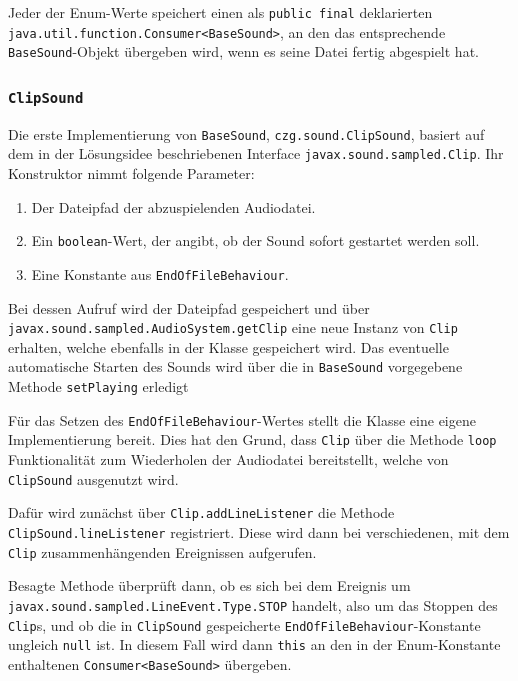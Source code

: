 \begin{sloppypar}
Jeder der Enum-Werte speichert einen als \texttt{public final}
deklarierten \texttt{java.util.function.Consumer<BaseSound>},
an den das entsprechende \texttt{BaseSound}-Objekt übergeben
wird, wenn es seine Datei fertig abgespielt hat.


\subsubsection{\texttt{ClipSound}}

Die erste Implementierung von \texttt{BaseSound}, \texttt{czg.sound.ClipSound},
basiert auf dem in der Lösungsidee beschriebenen Interface
\texttt{javax.sound.sampled.Clip}. Ihr Konstruktor nimmt folgende
Parameter:

\begin{enumerate}
	\item Der Dateipfad der abzuspielenden Audiodatei.
	\item Ein \texttt{boolean}-Wert, der angibt, ob der
	      Sound sofort gestartet werden soll.
	\item Eine Konstante aus \texttt{EndOfFileBehaviour}.
\end{enumerate}

Bei dessen Aufruf wird der Dateipfad gespeichert und über
\texttt{javax.sound.sampled.AudioSystem.getClip} eine
neue Instanz von \texttt{Clip} erhalten, welche ebenfalls
in der Klasse gespeichert wird. Das eventuelle automatische
Starten des Sounds wird über die in \texttt{BaseSound} vorgegebene Methode
\texttt{setPlaying} erledigt

Für das Setzen des \texttt{EndOfFileBehaviour}-Wertes
stellt die Klasse eine eigene Implementierung bereit.
Dies hat den Grund, dass \texttt{Clip} über die Methode
\texttt{loop} Funktionalität zum Wiederholen der Audiodatei
bereitstellt, welche von \texttt{ClipSound} ausgenutzt wird.

Dafür wird zunächst über \texttt{Clip.addLineListener}
die Methode \texttt{ClipSound.lineListener} registriert.
Diese wird dann bei verschiedenen, mit dem \texttt{Clip}
zusammenhängenden Ereignissen aufgerufen.

Besagte Methode überprüft dann, ob es sich bei dem
Ereignis um \texttt{javax.sound.sampled.LineEvent.Type.STOP}
handelt, also um das Stoppen des \texttt{Clip}s, und
ob die in \texttt{ClipSound} gespeicherte
\texttt{EndOfFileBehaviour}-Konstante ungleich \texttt{null}
ist. In diesem Fall wird dann \texttt{this} an den
in der Enum-Konstante enthaltenen \texttt{Consumer<BaseSound>}
übergeben.


\end{sloppypar}
